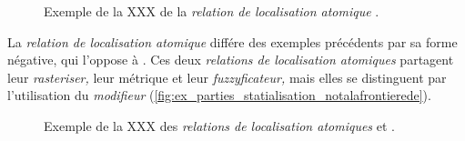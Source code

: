 \begin{figure}
  \centering  
  \caption{Exemple de la XXX de la \emph{relation de localisation
      atomique} \protect{}.}
  \label{fig:ex_parties_statialisation_dansplani}
\end{figure}

La \emph{relation de localisation atomique}
 différe des exemples
précédents par sa forme négative, qui l'oppose à
. Ces deux \emph{relations de
localisation atomiques} partagent leur \emph{rasteriser,} leur
métrique et leur \emph{fuzzyficateur,} mais elles se distinguent par
l'utilisation du \emph{modifieur}  (\autoref{fig:ex_parties_statialisation_notalafrontierede}).

\begin{figure}
  \centering  
  \caption{Exemple de la XXX des \emph{relations de localisation
      atomiques} \protect{} et
    \protect{}.}
  \label{fig:ex_parties_statialisation_notalafrontierede}
\end{figure}

